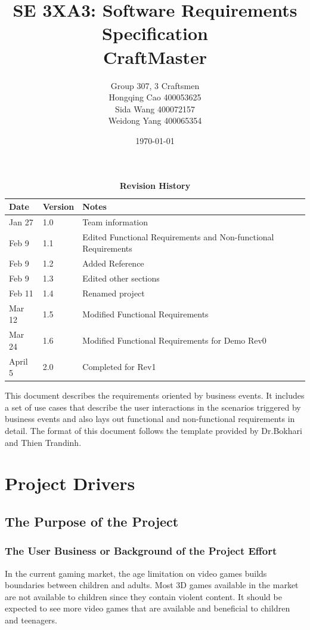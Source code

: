 \documentclass[12pt, titlepage]{article}
\title{SE 3XA3: Software Requirements Specification\\CraftMaster}
\author{Group 307, 3 Craftsmen\\
		Hongqing Cao 400053625\\
		Sida Wang	 400072157\\
		Weidong Yang 400065354}
\date{\today}
\begin{document}
\maketitle

\tableofcontents
\listoftables
\listoffigures
\FloatBarrier
\begin{table}[bp]
\begin{tabularx}{\textwidth}{p{3cm}p{2cm}X}
\toprule {\bf Date} & {\bf Version} & {\bf Notes}\\
\midrule
Jan 27 & 1.0 & Team information\\
Feb 9 & 1.1 & Edited Functional Requirements and Non-functional Requirements\\
Feb 9 & 1.2 & Added Reference\\
Feb 9 & 1.3 & Edited other sections\\
Feb 11 & 1.4 & Renamed project\\
Mar 12 & 1.5 & Modified Functional Requirements\\
Mar 24 & 1.6 & Modified Functional Requirements for Demo Rev0\\
April 5 & 2.0 & Completed for Rev1\\
\bottomrule
\end{tabularx}
\caption{\bf Revision History}
\end{table}
\FloatBarrier
\newpage


This document describes the requirements oriented by business events. It includes a set of use cases that describe the user interactions in the scenarios triggered by business events and also lays out functional and non-functional requirements in detail. The format of this document follows the template provided by Dr.Bokhari and Thien Trandinh.

\section{Project Drivers}

\subsection{The Purpose of the Project}
\subsubsection{The User Business or Background of the Project Effort}
In the current gaming market, the age limitation on video games builds boundaries between children and adults. Most 3D games available in the market are not available to children since they contain violent content. It should be expected to see more video games that are available and beneficial to children and teenagers.
\end{document}
